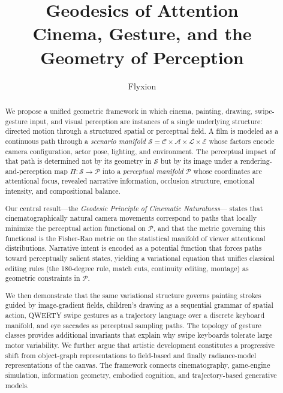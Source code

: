 \documentclass[12pt,a4paper]{article}
\title{\textbf{Geodesics of Attention}\\[4pt]
\large Cinema, Gesture, and the Geometry of Perception}
\author{Flyxion}
\date{}
\theoremstyle{plain}
\theoremstyle{definition}
\begin{document}
\maketitle
\thispagestyle{empty}

\begin{abstract}
We propose a unified geometric framework in which cinema, painting, drawing,
swipe-gesture input, and visual perception are instances of a single underlying
structure: directed motion through a structured spatial or perceptual field.
A film is modeled as a continuous path through a \emph{scenario manifold}
$\mathcal{S} = \mathcal{C}\times\mathcal{A}\times\mathcal{L}\times\mathcal{E}$
whose factors encode camera configuration, actor pose, lighting, and environment.
The perceptual impact of that path is determined not by its geometry in
$\mathcal{S}$ but by its image under a rendering-and-perception map
$\Pi:\mathcal{S}\to\mathcal{P}$ into a \emph{perceptual manifold} $\mathcal{P}$
whose coordinates are attentional focus, revealed narrative information,
occlusion structure, emotional intensity, and compositional balance.

Our central result---the \emph{Geodesic Principle of Cinematic Naturalness}---
states that cinematographically natural camera movements correspond to paths
that locally minimize the perceptual action functional on $\mathcal{P}$, and
that the metric governing this functional is the Fisher-Rao metric on the
statistical manifold of viewer attentional distributions. Narrative intent is
encoded as a potential function that forces paths toward perceptually salient
states, yielding a variational equation that unifies classical editing rules
(the 180-degree rule, match cuts, continuity editing, montage) as geometric
constraints in $\mathcal{P}$.

We then demonstrate that the same variational structure governs painting strokes
guided by image-gradient fields, children's drawing as a sequential grammar of
spatial action, QWERTY swipe gestures as a trajectory language over a discrete
keyboard manifold, and eye saccades as perceptual sampling paths. The topology
of gesture classes provides additional invariants that explain why swipe
keyboards tolerate large motor variability. We further argue that artistic
development constitutes a progressive shift from object-graph representations
to field-based and finally radiance-model representations of the canvas. The
framework connects cinematography, game-engine simulation, information geometry,
embodied cognition, and trajectory-based generative models.
\end{abstract}
\end{document}
